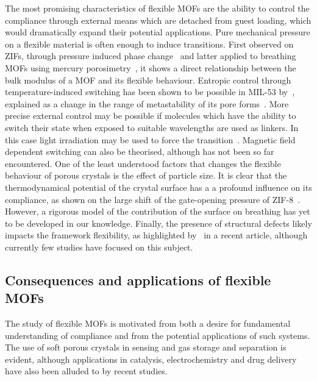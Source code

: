 The most promising characteristics of flexible MOFs are the ability
to control the compliance through external means which are 
detached from guest loading, which would dramatically expand
their potential applications. 
Pure mechanical pressure on a flexible material 
is often enough to induce transitions. First observed on 
ZIFs, through pressure induced phase 
change~\cite{chapmanTrappingGuestsNanoporous2011, %
tanMechanicalPropertiesHybrid2011} and 
latter applied to breathing MOFs using
mercury porosimetry~\cite{beurroiesUsingPressureProvoke2010, %
yotLargeBreathingMOF2012}, it 
shows a direct relationship between the bulk modulus of 
a MOF and its flexible behaviour.
Entropic control through temperature-induced switching has been
shown to be possible in MIL-53 
by~\citet{liuReversibleStructuralTransition2008}, explained 
as a change in the range of metastability of its 
pore forms~\cite{boutinBehaviorFlexibleMIL532010}. 
More precise external control may be possible if molecules which
have the ability to switch their state when exposed to suitable
wavelengths are used as linkers. In this case light irradiation 
may be used to force the 
transition~\cite{lyndonDynamicPhotoSwitchingMetalOrganic2013}.
Magnetic field dependent switching can also be theorised, although
has not been so far encountered.
One of the least understood factors that changes the flexible
behaviour of porous crystals is the effect of particle size.
It is clear that the thermodynamical potential of the crystal surface
has a a profound influence on its compliance, as shown on 
the large shift of the gate-opening pressure of 
ZIF-8~\cite{zhangCrystalSizeDependentStructuralTransitions2014}.
However, a rigorous model of the contribution of the surface 
on breathing has yet to be developed in our knowledge.
Finally, the presence of structural defects likely impacts 
the framework flexibility, as highlighted 
by~\citet{bennettInterplayDefectsDisorder2016} in a 
recent article, although currently few studies have focused
on this subject.

\subsection{Consequences and applications of flexible MOFs}

The study of flexible MOFs is motivated from both a desire 
for fundamental understanding of compliance and from the potential
applications of such systems. The use of soft porous crystals
in sensing and gas storage and separation is evident, although 
applications in catalysis, electrochemistry and drug delivery 
have also been alluded to by recent studies.

